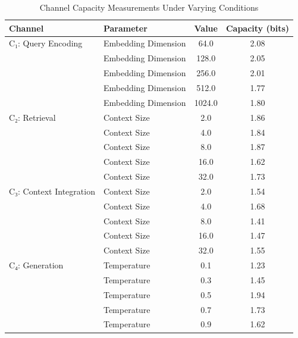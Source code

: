 \begin{table}[t]
\centering
\caption{Channel Capacity Measurements Under Varying Conditions}
\label{tab:channel_capacity}
\begin{tabular}{llcc}
\toprule
Channel & Parameter & Value & Capacity (bits) \\
\midrule
C₁: Query Encoding & Embedding Dimension & 64.0 & 2.08 \\
 & Embedding Dimension & 128.0 & 2.05 \\
 & Embedding Dimension & 256.0 & 2.01 \\
 & Embedding Dimension & 512.0 & 1.77 \\
 & Embedding Dimension & 1024.0 & 1.80 \\
C₂: Retrieval & Context Size & 2.0 & 1.86 \\
 & Context Size & 4.0 & 1.84 \\
 & Context Size & 8.0 & 1.87 \\
 & Context Size & 16.0 & 1.62 \\
 & Context Size & 32.0 & 1.73 \\
C₃: Context Integration & Context Size & 2.0 & 1.54 \\
 & Context Size & 4.0 & 1.68 \\
 & Context Size & 8.0 & 1.41 \\
 & Context Size & 16.0 & 1.47 \\
 & Context Size & 32.0 & 1.55 \\
C₄: Generation & Temperature & 0.1 & 1.23 \\
 & Temperature & 0.3 & 1.45 \\
 & Temperature & 0.5 & 1.94 \\
 & Temperature & 0.7 & 1.73 \\
 & Temperature & 0.9 & 1.62 \\
\bottomrule
\end{tabular}
\end{table}
